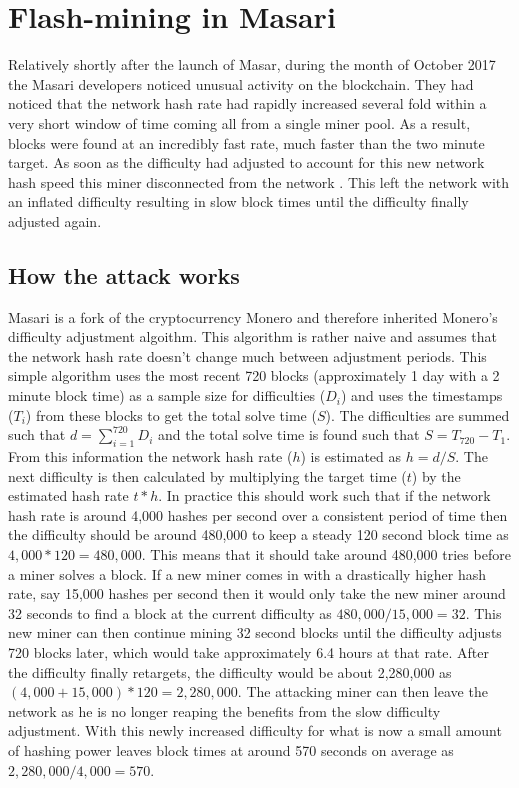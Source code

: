 \documentclass{article}
\begin{document}
\section{Flash-mining in Masari}
Relatively shortly after the launch of Masar, during the month of October 2017 the Masari developers noticed unusual activity on the blockchain. They had noticed that the network hash rate had rapidly increased several fold within a very short window of time coming all from a single miner pool. As a result, blocks were found at an incredibly fast rate, much faster than the two minute target. As soon as the difficulty had adjusted to account for this new network hash speed this miner disconnected from the network . This left the network with an inflated difficulty resulting in slow block times until the difficulty finally adjusted again.

\subsection{How the attack works}
Masari is a fork of the cryptocurrency Monero and therefore inherited Monero's difficulty adjustment algoithm. This algorithm is rather naive and assumes that the network hash rate doesn't change much between adjustment periods. This simple algorithm uses the most recent 720 blocks (approximately 1 day with a 2 minute block time) as a sample size for difficulties ($D_i$) and uses the timestamps ($T_i$) from these blocks to get the total solve time ($S$). The difficulties are summed such that $d = \sum_{i=1}^{720} D_{i}$ and the total solve time is found such that $S = T_{720} - T_1$. From this information the network hash rate ($h$) is estimated as $h = d / S$. The next difficulty is then calculated by multiplying the target time ($t$) by the estimated hash rate $t * h$. In practice this should work such that if the network hash rate is around 4,000 hashes per second over a consistent period of time then the difficulty should be around 480,000 to keep a steady 120 second block time as $4,000 * 120 = 480,000$. This means that it should take around 480,000 tries before a miner solves a block. If a new miner comes in with a drastically higher hash rate, say 15,000 hashes per second then it would only take the new miner around 32 seconds to find a block at the current difficulty as $480,000 / 15,000 = 32$. This new miner can then continue mining 32 second blocks until the difficulty adjusts 720 blocks later, which would take approximately 6.4 hours at that rate. After the difficulty finally retargets, the difficulty would be about 2,280,000 as $(4,000 + 15,000) * 120 = 2,280,000$. The attacking miner can then leave the network as he is no longer reaping the benefits from the slow difficulty adjustment. With this newly increased difficulty for what is now a small amount of hashing power leaves block times at around 570 seconds on average as $2,280,000 / 4,000 = 570$.
\end{document}
